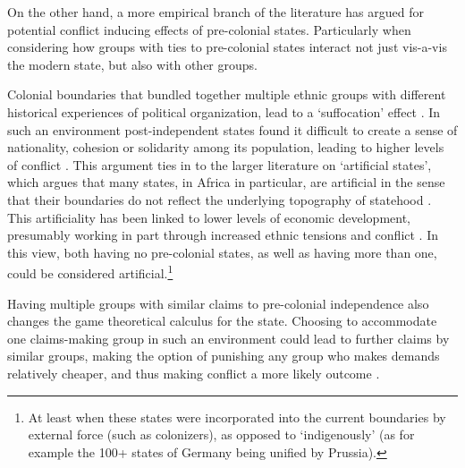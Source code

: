 \documentclass[12pt]{article}
\begin{document}
On the other hand, a more empirical branch of the literature has argued for 
potential conflict inducing effects of pre-colonial states. Particularly when
considering how groups with ties to pre-colonial states interact not just
vis-a-vis the modern state, but also with other groups.

Colonial boundaries that bundled together multiple ethnic groups with different
historical experiences of political organization, lead to a `suffocation' effect
\citep{Englebert2002}. In such an environment post-independent states found it
difficult to create a sense of nationality, cohesion or solidarity among its
population, leading to higher levels of conflict \citep{Englebert2002}. This
argument ties in to the larger literature on `artificial states', which argues
that many states, in Africa in particular, are artificial in the sense that
their boundaries do not reflect the underlying topography of statehood
\citep{Alesina2011}. This artificiality has been linked to lower levels of
economic development, presumably working in part through increased ethnic
tensions and conflict \citep{Alesina2011}. In this view, both having no
pre-colonial states, as well as having more than one, could be considered
artificial.\footnote{At least when these states were incorporated into the
current boundaries by external force (such as colonizers), as opposed to
`indigenously' (as for example the 100+ states of Germany being unified by
Prussia).} 

Having multiple groups with similar claims to pre-colonial independence also
changes the game theoretical calculus for the state. Choosing to accommodate one
claims-making group in such an environment could lead to further claims by
similar groups, making the option of punishing any group who makes demands
relatively cheaper, and thus making conflict a more likely outcome
\citep{Wishman}.
\end{document}
